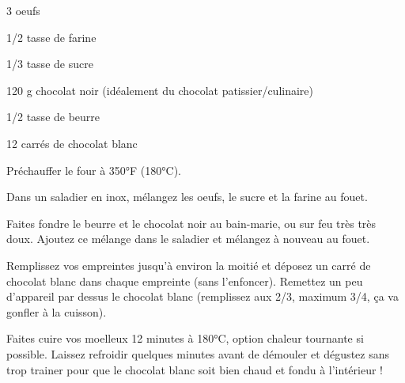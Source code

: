 %
%   
%   
%   
%




\totaltime{}


\begin{ingredients}
    \item 3 oeufs
    \item 1/2 tasse de farine
    \item 1/3 tasse de sucre
    \item 120 g chocolat noir (idéalement du chocolat patissier/culinaire)
    \item 1/2 tasse de beurre
    \item 12 carrés de chocolat blanc
\end{ingredients}

\begin{steps}
    \item Préchauffer le four à 350°F (180°C).
    \item Dans un saladier en inox, mélangez les oeufs, le sucre et la farine au fouet.
    \item Faites fondre le beurre et le chocolat noir au bain-marie, ou sur feu très très doux. Ajoutez ce mélange dans le saladier et mélangez à nouveau au fouet.
    \item Remplissez vos empreintes jusqu'à environ la moitié et déposez un carré de chocolat blanc dans chaque empreinte (sans l'enfoncer). Remettez un peu d'appareil par dessus le chocolat blanc (remplissez aux 2/3, maximum 3/4, ça va gonfler à la cuisson).
    \item Faites cuire vos moelleux 12 minutes à 180°C, option chaleur tournante si possible. Laissez refroidir quelques minutes avant de démouler et dégustez sans trop trainer pour que le chocolat blanc soit bien chaud et fondu à l'intérieur !
\end{steps}
